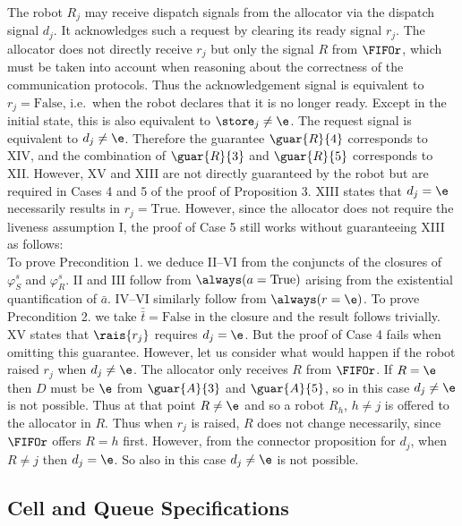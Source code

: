 The robot $R_j$ may receive dispatch signals from the allocator via the dispatch signal $d_j$. It acknowledges such a request by clearing its ready signal $r_j$. The allocator does not directly receive $r_j$ but only the signal $R$ from $\FIFOr$, which must be taken into account when reasoning about the correctness of the communication protocols. Thus the acknowledgement signal is equivalent to $r_j = \mathrm{False}$, i.e.\ when the robot declares that it is no longer ready. Except in the initial state, this is also equivalent to $\store_j \neq \e$. The request signal is equivalent to $d_j \neq \e$. Therefore the guarantee $\guar{R}{4}$ corresponds to XIV, and the combination of $\guar{R}{3}$ and $\guar{R}{5}$ corresponds to XII. However, XV and XIII are not directly guaranteed by the robot but are required in Cases 4 and 5 of the proof of Proposition 3. XIII states that $d_j=\e$ necessarily results in $r_j=\mathrm{True}$. However, since the allocator does not require the liveness assumption I, the proof of Case 5 still works without guaranteeing XIII as follows:\\

To prove Precondition 1. we deduce II--VI from the conjuncts of the closures of $\varphi_S^s$ and $\varphi_R^s$. II and III follow from $\always(a = \mathrm{True})$ arising from the existential quantification of $\bar{a}$. IV--VI similarly follow from $\always(r = \e)$. To prove Precondition 2. we take $\bar{\bar{t}} = \mathrm{False}$ in the closure and the result follows trivially.\\

XV states that $\rais{r_j}$ requires $d_j=\e$. But the proof of Case 4 fails when omitting this guarantee. However, let us consider what would happen if the robot raised $r_j$ when $d_j\neq\e$. The allocator only receives $R$ from $\FIFOr$. If $R = \e$ then $D$ must be $\e$ from $\guar{A}{3}$ and $\guar{A}{5}$, so in this case $d_j\neq\e$ is not possible. Thus at that point $R\neq\e$ and so a robot $R_h$, $h \neq j$ is offered to the allocator in $R$. Thus when $r_j$ is raised, $R$ does not change necessarily, since $\FIFOr$ offers $R=h$ first. However, from the connector proposition for $d_j$, when $R\neq j$ then $d_j=\e$. So also in this case $d_j\neq\e$ is not possible.\\


\subsection{Cell and Queue Specifications}

